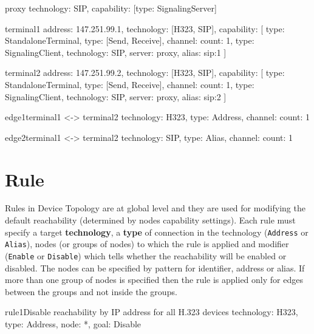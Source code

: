\documentclass[a4paper]{report}
\begin{document}
\begin{TopologyExample}{proxy}{}
technology: SIP,
capability: [{type: SignalingServer}]
\end{TopologyExample}

\begin{TopologyExample}{terminal1}{}
address: 147.251.99.1,
technology: [H323, SIP],
capability: [
  {type: StandaloneTerminal},
  {type: [Send, Receive], channel: {count: 1}}, 
  {type: SignalingClient, technology: SIP, server: proxy, alias: sip:1}
]
\end{TopologyExample}

\begin{TopologyExample}{terminal2}{}
address: 147.251.99.2,
technology: [H323, SIP],
capability: [
  {type: StandaloneTerminal},
  {type: [Send, Receive], channel: {count: 1}}, 
  {type: SignalingClient, technology: SIP, server: proxy, alias: sip:2}
]
\end{TopologyExample}

\begin{TopologyExample}{edge1}{terminal1 <-> terminal2}
technology: H323,
type: Address,
channel: {count: 1}
\end{TopologyExample}

\begin{TopologyExample}{edge2}{terminal1 <-> terminal2}
technology: SIP,
type: Alias,
channel: {count: 1}
\end{TopologyExample} 
  
  
\section{Rule}
Rules in Device Topology are at global level and they are used for modifying the default reachability (determined by nodes capability settings). Each rule must specify a target \textbf{technology}, a \textbf{type} of connection in the technology (\verb|Address| or \verb|Alias|), nodes (or groups of nodes) to which the rule is applied and modifier (\verb|Enable| or \verb|Disable|) which tells whether the reachability will be enabled or disabled. The nodes can be specified by pattern for identifier, address or alias. If more than one group of nodes is specified then the rule is applied only for edges between the groups and not inside the groups.

\begin{TopologyExample}{rule1}{Disable reachability by IP address for all H.323 devices}
technology: H323,
type: Address,
node: *,
goal: Disable
\end{TopologyExample}
\end{document}
